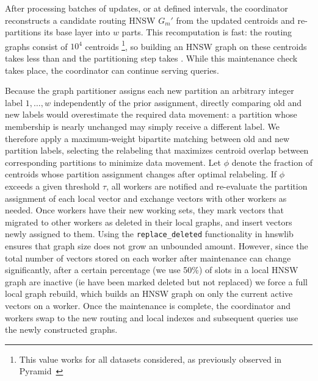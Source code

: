 \documentclass[sigconf,review,anonymous]{acmart}
\begin{document}
    After processing batches of updates, or at defined intervals, the coordinator reconstructs a candidate routing HNSW $G_m'$ from the updated centroids and re-partitions its base layer into $w$ parts. This recomputation is fast: the routing graphs consist of $10^4$ centroids \footnote{This value works for all datasets considered, as previously observed in Pyramid~\cite{deng2019pyramid}}, so building an HNSW graph on these centroids takes less than  and the partitioning step takes . While this maintenance check takes place, the coordinator can continue serving queries.

    Because the graph partitioner assigns each new partition an arbitrary integer label $1,\ldots,w$ independently of the prior assignment, directly comparing old and new labels would overestimate the required data movement: a partition whose membership is nearly unchanged may simply receive a different label. %
    We therefore apply a maximum-weight bipartite matching between old and new partition labels, selecting the relabeling that maximizes centroid overlap between corresponding partitions to minimize data movement. Let $\phi$ denote the fraction of centroids whose partition assignment changes after optimal relabeling. If $\phi$ exceeds a given threshold $\tau$, all workers are notified and re-evaluate the partition assignment of each local vector and exchange vectors with other workers as needed. Once workers have their new working sets, they mark vectors that migrated to other workers as deleted in their local graphs, and insert vectors newly assigned to them. Using the \texttt{replace\_deleted} functionality in hnswlib ensures that graph size does not grow an unbounded amount. However, since the total number of vectors stored on each worker after maintenance can change significantly, after a certain percentage (we use 50\%) of slots in a local HNSW graph are inactive (ie have been marked deleted but not replaced) we force a full local graph rebuild, which builds an HNSW graph on only the current active vectors on a worker. Once the maintenance is complete, the coordinator and workers swap to the new routing and local indexes and subsequent queries use the newly constructed graphs.
    
\end{document}
